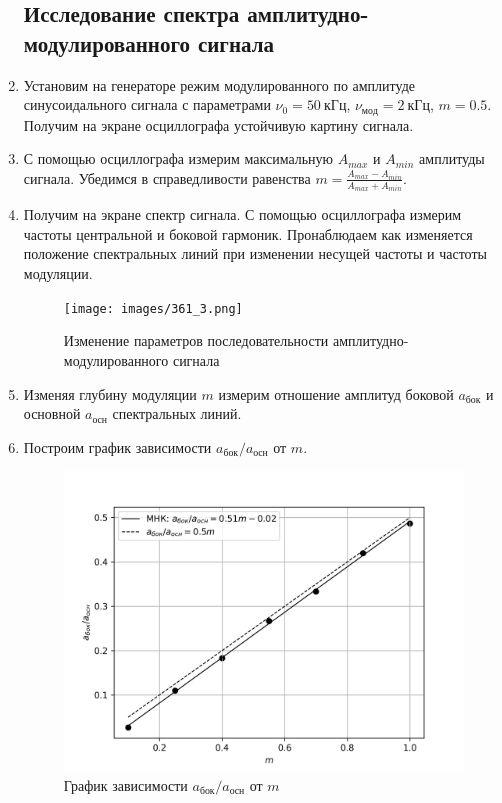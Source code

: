 \documentclass[14pt, a4paper]{report}
\begin{document}
\begin{enumerate}
\subsection{Исследование спектра амплитудно-модулированного сигнала}

\setcounter{enumi}{18}

\item Установим на генераторе режим модулированного по амплитуде синусоидального сигнала с параметрами $\nu_0=50\ кГц$, $\nu_{мод}=2\ кГц$, $m=0.5$. Получим на экране осциллографа устойчивую картину сигнала.

\item С помощью осциллографа измерим максимальную $A_{max}$ и $A_{min}$ амплитуды сигнала. Убедимся в справедливости равенства $m=\frac{A_{max}-A_{min}}{A_{max}+A_{min}}$.

\item Получим на экране спектр сигнала. С помощью осциллографа измерим частоты центральной и боковой гармоник. Пронаблюдаем как изменяется положение спектральных линий при изменении несущей частоты и частоты модуляции.

\begin{figure}[H]
\centering
\texttt{[image: images/361\_3.png]}
\caption{Изменение параметров последовательности амплитудно-модулированного сигнала}
\end{figure}

\item Изменяя глубину модуляции $m$ измерим отношение амплитуд боковой $a_{бок}$ и основной $a_{осн}$ спектральных линий.

\item Построим график зависимости $a_{бок}/a_{осн}$ от $m$.

\begin{figure}[H]
\centering
\includegraphics[scale=0.6]{images/361_4.png}
\caption{График зависимости $a_{бок}/a_{осн}$ от $m$}
\end{figure}


\end{enumerate}
\end{document}
